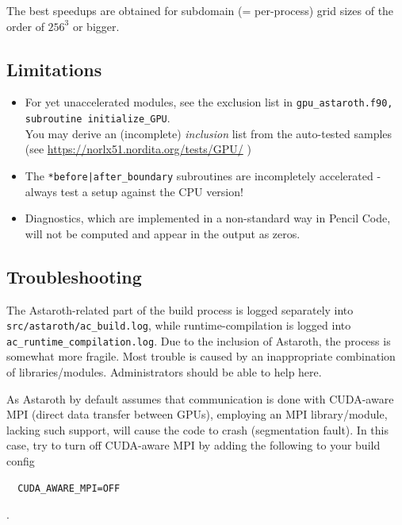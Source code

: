 \documentclass[a4paper,12pt]{article}
\newcommand{\command}[1]{\texttt{#1}}
\newcommand{\code}[1]{\texttt{#1}}
\begin{document}
The best speedups are obtained for subdomain (= per-process) grid sizes of the order of $256^3$ or bigger. 

\subsection{Limitations}
\begin{itemize}
\item For yet unaccelerated modules, see the exclusion list in \command{gpu\_astaroth.f90, subroutine initialize\_GPU}.\\
         You may derive an (incomplete) {\it inclusion} list from the auto-tested samples (see \url{https://norlx51.nordita.org/tests/GPU/} )
\item The \command{*before|after\_boundary} subroutines are incompletely accelerated - always test a setup against the CPU version!
\item Diagnostics, which are implemented in a non-standard way in Pencil Code, will not be computed and appear in the output as zeros.
\end{itemize}

\subsection{Troubleshooting}
The Astaroth-related part of the build process is logged separately into \code{src/astaroth/ac\_build.log}, while runtime-compilation is logged into \code{ac\_runtime\_compilation.log}.
Due to the inclusion of Astaroth, the process is somewhat more fragile. 
Most trouble is caused by an inappropriate combination of libraries/modules.
Administrators should be able to help here.

As Astaroth by default assumes that communication is done with CUDA-aware MPI (direct data transfer between GPUs),
employing an MPI library/module, lacking such support, will cause the code to crash (segmentation fault). 
In this case, try to turn off CUDA-aware MPI by adding the following to your build config
\begin{verbatim}
  CUDA_AWARE_MPI=OFF
\end{verbatim}
.
\end{document}
